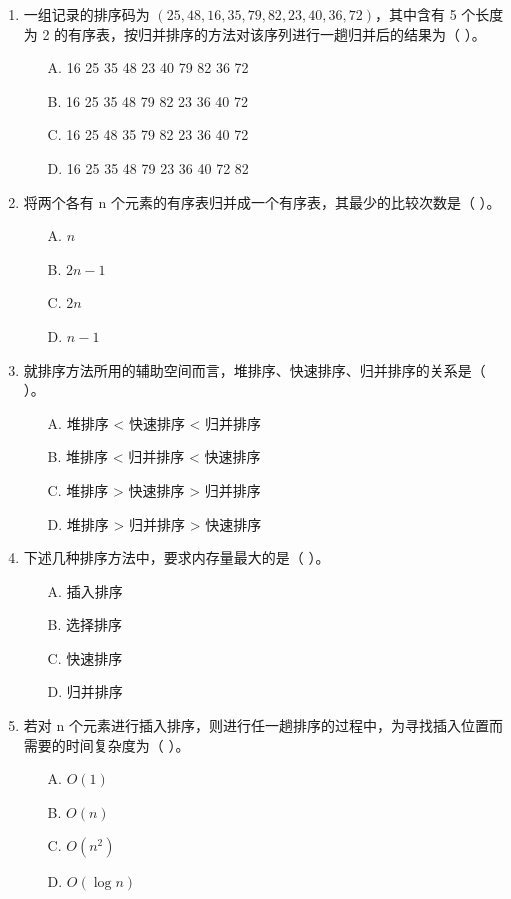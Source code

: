 \documentclass[12pt, a4paper]{article}
\begin{document}
\begin{enumerate}
    \item 一组记录的排序码为 $(25, 48, 16, 35, 79, 82, 23, 40, 36, 72)$，其中含有 5 个长度为 2 的有序表，按归并排序的方法对该序列进行一趟归并后的结果为（ ）。
    \begin{enumerate}
        \item[A.] 16 25 35 48 23 40 79 82 36 72
        \item[B.] 16 25 35 48 79 82 23 36 40 72
        \item[C.] 16 25 48 35 79 82 23 36 40 72
        \item[D.] 16 25 35 48 79 23 36 40 72 82
    \end{enumerate}
    
    \item 将两个各有 n 个元素的有序表归并成一个有序表，其最少的比较次数是（ ）。
    \begin{enumerate}
        \item[A.] $n$
        \item[B.] $2n-1$
        \item[C.] $2n$
        \item[D.] $n-1$
    \end{enumerate}
    
    \item 就排序方法所用的辅助空间而言，堆排序、快速排序、归并排序的关系是（ ）。
    \begin{enumerate}
        \item[A.] 堆排序 < 快速排序 < 归并排序
        \item[B.] 堆排序 < 归并排序 < 快速排序
        \item[C.] 堆排序 > 快速排序 > 归并排序
        \item[D.] 堆排序 > 归并排序 > 快速排序
    \end{enumerate}
    
    \item 下述几种排序方法中，要求内存量最大的是（ ）。
    \begin{enumerate}
        \item[A.] 插入排序
        \item[B.] 选择排序
        \item[C.] 快速排序
        \item[D.] 归并排序
    \end{enumerate}
    
    \item 若对 n 个元素进行插入排序，则进行任一趟排序的过程中，为寻找插入位置而需要的时间复杂度为（ ）。
    \begin{enumerate}
        \item[A.] $O(1)$
        \item[B.] $O(n)$
        \item[C.] $O(n^2)$
        \item[D.] $O(\log n)$
    \end{enumerate}
    

\end{enumerate}
\end{document}
